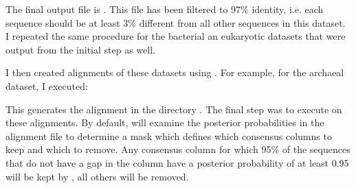 The final output file is . This file has
been filtered to 97\% identity, i.e. each sequence should be at least
3\% different from all other sequences in this dataset. I repeated the
same procedure for the bacterial an eukaryotic datasets that were
output from the initial  step as well.

I then created alignments of these datasets using
. For example, for the archaeal dataset, I executed: 


This generates the alignment  in the
directory .  The final step was to execute
 on these alignments. By default,  will
examine the posterior probabilities in the alignment file to determine
a mask which defines which consensus columns to keep and which to
remove. Any consensus column for which 95\% of the sequences that do
not have a gap in the column have a posterior probability of at least
0.95 will be kept by , all others will be removed. 

